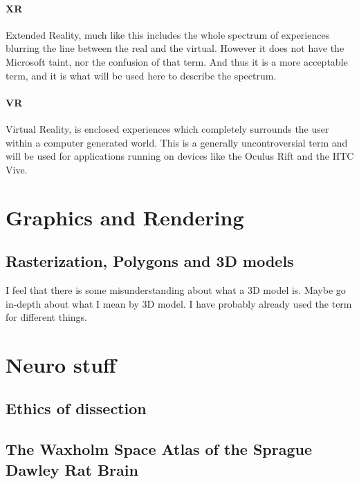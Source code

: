 
\paragraph*{XR}\label{para:xr} Extended Reality, much like  this includes the whole spectrum of experiences blurring the line between the real and the virtual. However it does not have the Microsoft taint, nor the confusion of that term. And thus it is a more acceptable term, and it is what will be used here to describe the spectrum.

\paragraph*{VR}\label{para:vr} Virtual Reality, is enclosed experiences which completely surrounds the user within a computer generated world. This is a generally uncontroversial term and will be used for applications running on devices like the Oculus Rift and the HTC Vive.


\section{Graphics and Rendering}

\subsection*{Rasterization, Polygons and 3D models}

{
    \color{BrickRed}
    I feel that there is some misunderstanding about what a 3D model is.
    Maybe go in-depth about what I mean by 3D model. I have probably already used the term for different things.
}

\section{Neuro stuff}

\subsection*{Ethics of dissection}\label{chap:ethics}

\subsection*{The Waxholm Space Atlas of the Sprague Dawley Rat Brain}\label{chap:ratbrain}

